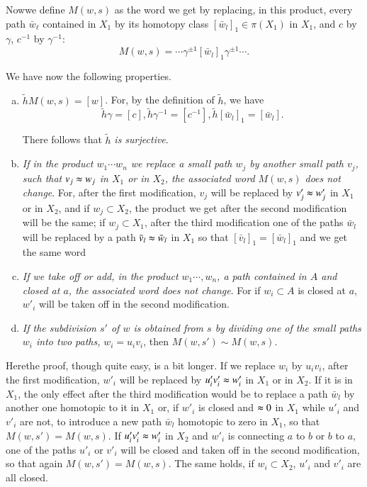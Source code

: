 Now\pageoriginale we define $M(w,s)$ as the word we get by replacing,
in this product, every path $\bar{w}_\ell$ contained in $X_1$ by its
homotopy class $[\bar{w}_{l}]_1 \in \pi (X_1)$ in $X_1$, and  $c$
by $\gamma$, $c^{-1}$ by $\gamma^{-1}$:     
$$
 M(w, s) = \cdots \gamma^{\pm 1}[\bar{w}_l]_1 \gamma^{\pm 1} \cdots. 
 $$
 
  We have now the following properties.
 \begin{enumerate}[(a)]
\item $\tilde{h} M(w, s) = [w]$. For, by the definition of
  $\tilde{h}$, we have 
$$
\tilde{h} \gamma = [c], \tilde{h}
  \gamma^{-1} = [c^{-1}], \tilde{h} [\bar{w}_l]_1 = [\bar{w}_l]. 
$$

There follows that $\tilde{h}$ \textit{is surjective}. 

\item \textit{If in the product $w_1 \cdots  w_n$ we replace a small 
  path $w_j$ by another small path $v_j$, such that  $v_j \thickapprox
  w_j$ in $X_1$ or in $X_2$, the associated word $M(w,s)$ does not
  change}. For, after the first modification, $v_j$ will be replaced
  by $v'_j \thickapprox w'_j$ in $X_1$ or in $X_2$, and if $w_j
  \subset X_2$, the product we get after the second modification will
  be the same; if $w_j \subset X_1$, after the third modification one 
  of the paths $\bar{w}_l$ will be replaced by a path $\bar{v}_l
  \thickapprox \bar{w}_l$ in $X_1$ so that $[\bar{v}_l]_1 =
               [\bar{w}_l]_1$ and we get the same word 

\item \textit{If we take off or add, in the product $w_1 \cdots,w_n$,
  a path contained in $A$ and closed at $a$, the associated word does
  not change}. For if $w_i \subset A$ is closed at $a$, $w'_i$ will
  be taken off in the second modification. 

\item \textit{If the subdivision $s'$ of $w$ is obtained from $s$ by
  dividing one of the small paths $w_i$ into two paths,} $w_i  = u_i
  v_i$, then $M(w, s') \sim M(w,s)$. 
  \end{enumerate}  
  
  Here\pageoriginale the proof, though quite easy, is a bit longer. If
  we replace $w_i$ by $u_iv_i$, after the first modification,
  $w'_i$ will be replaced by $u'_i v'_i \thickapprox w'_i$ in $X_1$ or
  in $X_2$. If it is in $X_1$, the only  effect after the third
  modification would 
  be to replace a path $\bar{w}_l$ by another one homotopic to it in
  $X_1$ or, if $w'_i$ is closed and $\thickapprox 0$ in $X_1$ while
  $u'_i$ and $v'_i$ are not, to introduce a new path $\bar{w}_l$
  homotopic to zero in $X_1$, so that $M (w, s') =M(w,s)$. If  $u'_i
  v'_i \thickapprox w'_i$ in $X_2$ and $w'_i$ is connecting  $a$ to
  $b$ or $b$ to $a$, one of the paths $u'_i$ or $v'_i$ will be closed
  and taken off in  the second modification, so that again $M(w,s')=
  M(w,s)$. The same holds, if $w_i  \subset X_2$, $u'_i$ and $v'_i$ are
  all closed. 
  
